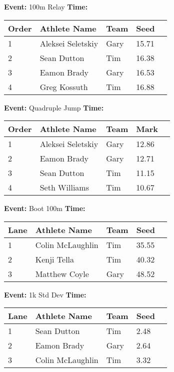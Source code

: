 \documentclass[10pt]{article}
\begin{document}
\textbf{Event:} 100m Relay \quad \textbf{Time:}  

\vspace{1em}
\begin{tabular}{@{}lllll@{}}
\toprule

\textbf{Order} & \textbf{Athlete Name} & \textbf{Team} & \textbf{Seed} \\
\midrule
1 & Aleksei Seletskiy & Gary & 15.71 &\\
2 & Sean Dutton & Tim & 16.38 &\\
3 & Eamon Brady & Gary & 16.53 &\\
4 & Greg Kossuth & Tim & 16.88 &\\
\bottomrule
\end{tabular}
\vspace{2.5em}


\textbf{Event:} Quadruple Jump \quad \textbf{Time:}  

\vspace{1em}
\begin{tabular}{@{}lllll@{}}
\toprule

\textbf{Order} & \textbf{Athlete Name} & \textbf{Team} & \textbf{Mark} \\
\midrule
1 & Aleksei Seletskiy & Gary & 12.86 &\\
2 & Eamon Brady & Gary & 12.71 &\\
3 & Sean Dutton & Tim & 11.15 &\\
4 & Seth Williams & Tim & 10.67 &\\
\bottomrule
\end{tabular}
\vspace{2.5em}


\textbf{Event:} Boot 100m \quad \textbf{Time:}  

\vspace{1em}
\begin{tabular}{@{}lllll@{}}
\toprule

\textbf{Lane} & \textbf{Athlete Name} & \textbf{Team} & \textbf{Seed} \\
\midrule
1 & Colin McLaughlin & Tim & 35.55 &\\
2 & Kenji Tella & Tim & 40.32 &\\
3 & Matthew Coyle & Gary & 48.52 &\\
\bottomrule
\end{tabular}
\vspace{2.5em}


\textbf{Event:} 1k Std Dev \quad \textbf{Time:}  

\vspace{1em}
\begin{tabular}{@{}lllll@{}}
\toprule

\textbf{Lane} & \textbf{Athlete Name} & \textbf{Team} & \textbf{Seed} \\
\midrule
1 & Sean Dutton & Tim & 2.48 &\\
2 & Eamon Brady & Gary & 2.64 &\\
3 & Colin McLaughlin & Tim & 3.32 &\\
\bottomrule
\end{tabular}
\vspace{2.5em}
\end{document}
